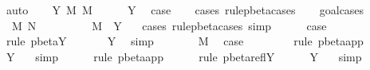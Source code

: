 \begin{isabellebody}
\ auto\isanewline
\ \ \isamarkupfalse%
\isanewline
{}\isamarkupfalse%
\isanewline
{}\isamarkupfalse%
\ {\isacharparenleft}Y\ M\ M{\isacharprime}\ {\isasymsigma}{\isacharparenright}\ \isanewline
\ \ \isamarkupfalse%
\ Y{\isacharparenleft}{}{\isacharparenright}\ \isamarkupfalse%
\ {\isacharquery}case\isanewline
\ \ \isamarkupfalse%
\ {\isacharparenleft}cases\ rule{\isacharcolon}pbeta{\isachardot}cases{\isacharparenright}\isanewline
\ \ \isamarkupfalse%
\ goal{\isacharunderscore}cases\isanewline
\ \ \isamarkupfalse%
\ {\isacharparenleft}{}\ M{\isacharprime}{\isacharprime}\ N{\isacharprime}{\isacharprime}{\isacharparenright}\isanewline
\ \ \ \ \isamarkupfalse%
\ {}{\isacharparenleft}{}{\isacharparenright}\ \isamarkupfalse%
\ {}{\isacharcolon}\ {\isachardoublequoteopen}M{\isacharprime}{\isacharprime}\ {\isacharequal}\ Y\ {\isasymsigma}{\isachardoublequoteclose}\ \isamarkupfalse%
\ {\isacharparenleft}cases\ rule{\isacharcolon}pbeta{\isachardot}cases{\isacharcomma}\ simp{\isacharparenright}\isanewline
\ \ \ \ \isamarkupfalse%
\ {\isacharquery}case\ \isamarkupfalse%
\ {}\ {}\isanewline
\ \ \ \ \isamarkupfalse%
\ {\isacharparenleft}rule\ pbeta{\isachardot}Y{\isacharparenright}\isanewline
\ \ \ \ \isamarkupfalse%
\ {}\ Y\ \isamarkupfalse%
\ simp\isanewline
\ \ \isamarkupfalse%
\isanewline
\ \ \isamarkupfalse%
\ {\isacharparenleft}{}\ M{\isacharprime}{\isacharprime}{\isacharparenright}\ \isamarkupfalse%
\ {\isacharquery}case\ \isamarkupfalse%
\ {}\isanewline
\ \ \ \ \isamarkupfalse%
\ {\isacharparenleft}rule\ pbeta{\isachardot}app{\isacharparenright}\isanewline
\ \ \ \ \isamarkupfalse%
\ Y\ {}\ \isamarkupfalse%
\ simp\isanewline
\ \ \ \ \isamarkupfalse%
\ {\isacharparenleft}rule\ pbeta{\isachardot}app{\isacharparenright}\isanewline
\ \ \ \ \isamarkupfalse%
\ {\isacharparenleft}rule\ pbeta{\isachardot}reflY{\isacharparenright}\isanewline
\ \ \ \ \isamarkupfalse%
\ Y\ {}\ \isamarkupfalse%
\ simp\isanewline
\ \ \isamarkupfalse%
\isanewline
{}\isamarkupfalse%

\end{isabellebody}
